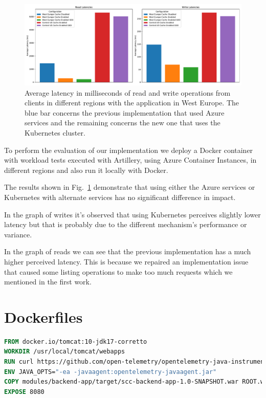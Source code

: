 \documentclass[runningheads]{llncs}
\begin{document}
\begin{figure}
    \includegraphics[width=\textwidth]{latencies}
    \caption{Average latency in milliseconds of read and write operations from clients in different regions with the application in West Europe. The blue bar concerns the previous implementation that used Azure services and the remaining concerns the new one that uses the Kubernetes cluster.} \label{fig:latencies}
\end{figure}

To perform the evaluation of our implementation we deploy a Docker container with workload tests executed with Artillery, using Azure Container Instances, in different regions and also run it locally with Docker.

The results shown in Fig.~\ref{fig:latencies} demonstrate that using either the Azure services or Kubernetes with alternate services has no significant difference in impact. 

In the graph of writes it's observed that using Kubernetes perceives slightly lower latency but that is probably due to the different mechanism's performance or variance.  

In the graph of reads we can see that the previous implementation has a much higher perceived latency. This is because we repaired an implementation issue that caused some listing operations to make too much requests which we mentioned in the first work.

\clearpage
\appendix
\section{Dockerfiles}

\begin{lstlisting}[language=Dockerfile, caption=backend.dockerfile]
FROM docker.io/tomcat:10-jdk17-corretto
WORKDIR /usr/local/tomcat/webapps
RUN curl https://github.com/open-telemetry/opentelemetry-java-instrumentation/releases/download/v1.20.2/opentelemetry-javaagent.jar -L --output opentelemetry-javaagent.jar
ENV JAVA_OPTS="-ea -javaagent:opentelemetry-javaagent.jar"
COPY modules/backend-app/target/scc-backend-app-1.0-SNAPSHOT.war ROOT.war
EXPOSE 8080
\end{lstlisting}
\end{document}
